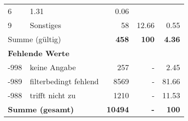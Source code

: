 \begin{longtable}{lXrrr}
       \num{6} &
       \num[round-mode=places,round-precision=2]{1.31} &
         \num[round-mode=places,round-precision=2]{0.06} \\

     9 &
     \multicolumn{1}{X}{ Sonstiges   } &


       \num{58} &
       \num[round-mode=places,round-precision=2]{12.66} &
         \num[round-mode=places,round-precision=2]{0.55} \\
     \midrule
     \multicolumn{2}{l}{Summe (gültig)} &
       \textbf{\num{458}} &
     \textbf{\num{100}} &
       \textbf{\num[round-mode=places,round-precision=2]{4.36}} \\
     \multicolumn{5}{l}{\textbf{Fehlende Werte}}\\
       -998 &
       keine Angabe &
         \num{257} &
        - &
         \num[round-mode=places,round-precision=2]{2.45} \\
       -989 &
       filterbedingt fehlend &
         \num{8569} &
        - &
         \num[round-mode=places,round-precision=2]{81.66} \\
       -988 &
       trifft nicht zu &
         \num{1210} &
        - &
         \num[round-mode=places,round-precision=2]{11.53} \\
     \midrule
     \multicolumn{2}{l}{\textbf{Summe (gesamt)}} &
          \textbf{\num{10494}} &
        \textbf{-} &
        \textbf{\num{100}} \\
     \bottomrule
     \end{longtable}
     
